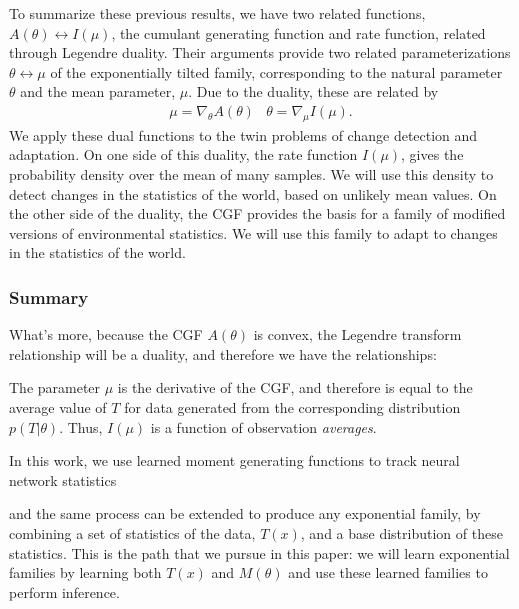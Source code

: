 \documentclass[10pt]{article}      %
\begin{document}
To summarize these previous results, we have two related functions, $A(\theta) \leftrightarrow I(\mu)$, the cumulant generating function and rate function, 
related through Legendre duality.
Their arguments provide two related parameterizations $\theta \leftrightarrow \mu$ of the exponentially tilted family, corresponding to the natural parameter $\theta$ and the mean parameter, $\mu$.
Due to the duality, these are related by 
\begin{eqnarray}
  \mu = \nabla_\theta A(\theta) & \theta = \nabla_\mu I(\mu). \label{eq:duality_relations}
\end{eqnarray}
We apply these dual functions to the twin problems of change detection and adaptation.
On one side of this duality, the rate function $I(\mu)$, gives the probability density over the mean of many samples.
We will use this density to detect changes in the statistics of the world, based on unlikely mean values.
On the other side of the duality, the CGF provides the basis for a family of modified versions of environmental statistics.
We will use this family to adapt to changes in the statistics of the world. 






\subsubsection{Summary}



What's more, because the CGF $A(\theta)$ is convex, the Legendre transform relationship will be a duality, and therefore we have the relationships:

The parameter $\mu$ is the derivative of the CGF, and therefore is equal to the average value of $T$ for data generated from the corresponding distribution $p(T|\theta)$.
Thus, $I(\mu)$ is a function of observation \textit{averages}.







In this work, we use learned moment generating functions to track neural network statistics 


and the same process can be extended to produce any exponential family, by combining a set of statistics of the data, $T(x)$, and a base distribution of these statistics.
This is the path that we pursue in this paper: we will learn exponential families by learning both $T(x)$ and $M(\theta)$ and use these learned families to perform inference.
\end{document}
